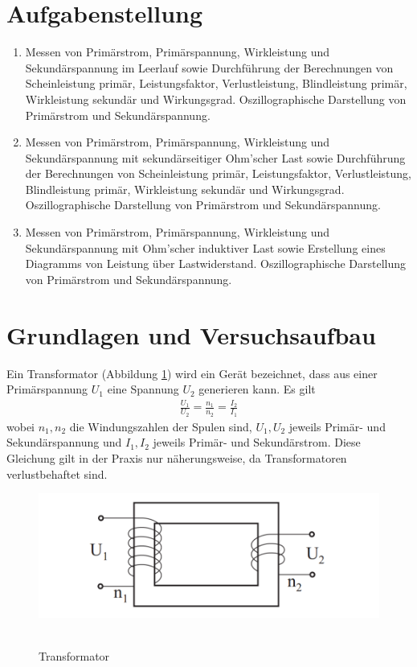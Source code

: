 \documentclass{article}
\begin{document}
\parindent0cm




\pagestyle{fancy}

\section{Aufgabenstellung}

\begin{enumerate}
\item Messen von Primärstrom, Primärspannung, Wirkleistung und Sekundärspannung im Leerlauf sowie Durchführung der Berechnungen von Scheinleistung primär, Leistungsfaktor, Verlustleistung, Blindleistung primär, Wirkleistung sekundär und Wirkungsgrad. Oszillographische Darstellung von Primärstrom und Sekundärspannung.
\item Messen von Primärstrom, Primärspannung, Wirkleistung und Sekundärspannung mit sekundärseitiger Ohm’scher Last sowie Durchführung der Berechnungen von Scheinleistung primär, Leistungsfaktor, Verlustleistung, Blindleistung primär, Wirkleistung sekundär und Wirkungsgrad. Oszillographische Darstellung von Primärstrom und Sekundärspannung.
\item Messen von Primärstrom, Primärspannung, Wirkleistung und Sekundärspannung mit Ohm'scher induktiver Last sowie Erstellung eines Diagramms von Leistung über Lastwiderstand. Oszillographische Darstellung von Primärstrom und Sekundärspannung.
\end{enumerate}



\section{Grundlagen und Versuchsaufbau}

Ein Transformator (Abbildung \ref{fig:transformator}) wird  ein Gerät bezeichnet, dass aus einer Primärspannung $U_1$ eine Spannung $U_2$ generieren kann. Es gilt
\begin{align}
\frac{U_1}{U_2} = \frac{n_1}{n_2} = \frac{I_2}{I_1}
\end{align}
wobei $n_1,n_2$ die Windungszahlen der Spulen sind, $U_1,U_2$ jeweils Primär- und Sekundärspannung und $I_1,I_2$ jeweils Primär- und Sekundärstrom. Diese Gleichung gilt in der Praxis nur näherungsweise, da Transformatoren verlustbehaftet sind.

\begin{figure}[H]
\caption{Transformator}
\label{fig:transformator}
{\centering
\includegraphics[scale=0.4]{transformator.png}
~
}
\end{figure}
\end{document}
